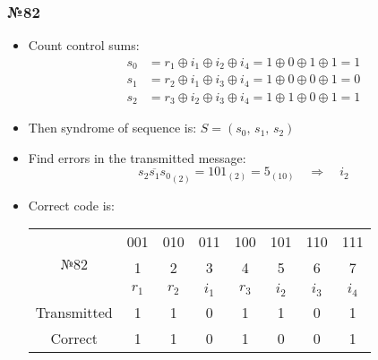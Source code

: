 \documentclass[12pt]{article}
\begin{document}
	\subsubsection{\Large №82}
	\begin{itemize}
		\item  Count control sums:
		\begin{align*}
			s_{0} &= r_{1}\oplus i_{1}\oplus i_{2}\oplus i_{4}=1\oplus0\oplus1\oplus1=1\\
			s_{1} &= r_{2}\oplus i_{1}\oplus i_{3}\oplus i_{4}=1\oplus0\oplus0\oplus1=0\\
			s_{2} &= r_{3}\oplus i_{2}\oplus i_{3}\oplus i_{4}=1\oplus1\oplus0\oplus1=1
		\end{align*}
		\item Then syndrome of sequence is: \(S = (s_{0},\,s_{1},\,s_{2})\)
		\item Find errors in the transmitted message: \[\overline{s_{2}s_{1}s_{0}}_{(2)} = 101_{(2)}=5_{(10)} \quad \Rightarrow \quad i_{2}\]
		\item Correct code is:
		\begin{table}[h!]
			\centering
			\begin{tabular}{ |c|c|c|c|c|c|c|c| } 
				\hline
				\multirow{3}{4em}{\centering№82} & 001 & 010 & 011 & 100 & 101 & 110 & 111 \\
				& 1 & 2 & 3 & 4 & 5 & 6 & 7 \\ 
				& \(r_{1}\) & \(r_{2}\) & \(i_{1}\) & \(r_{3}\) & \(i_{2}\) & \(i_{3}\) & \(i_{4}\) \\
				\hline 
				Transmitted & 1 & 1 & 0 & 1 & 1 & 0 & 1 \\ 
				\hline
				Correct & 1 & 1 & 0 & 1 & 0 & 0 & 1\\
				\hline
			\end{tabular}
		\end{table}
	\end{itemize}
\end{document}
